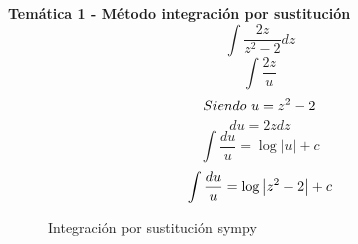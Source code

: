 

\textbf{Temática 1 - Método integración por sustitución}
\[\int \frac{2z}{z^2-2}dz\]
\[\int \frac{2z}{u}\]
\[Siendo \ u=z^2-2\]
\[du=2zdz\]
\[\int \frac{du}{u}=\log \left|u\right|+c\]
\[\int \frac{du}{u}=\log \left|z^2-2\right|+c\]

\begin{figure}[h]
    \begin{center}
        \caption{Integración por sustitución sympy}
    \end{center}
\end{figure}
